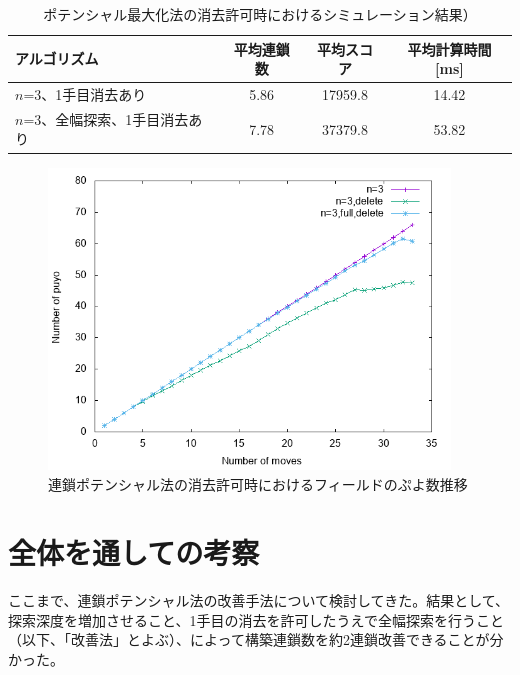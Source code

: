 \documentclass[12pt]{jreport}
\begin{document}
\begin{table}[tb]
\begin{center}
\caption{ポテンシャル最大化法の消去許可時におけるシミュレーション結果）} \label{tab:poten_del}
  \begin{tabular}{|l|c|c|c|} \hline
アルゴリズム & 平均連鎖数 & 平均スコア & 平均計算時間[ms]\\ \hline
$n$=3、1手目消去あり & 5.86 & 17959.8 & 14.42\\ \hline
$n$=3、全幅探索、1手目消去あり & 7.78 & 37379.8 & 53.82\\ \hline
\end{tabular}
\end{center}
\end{table}


\begin{figure}[tb]
  \begin{center}
  \includegraphics[height=8cm]{experiment/Potential/KAI/graph/totalPuyo_N3_N3del_N3fulldel.png}
  \caption{連鎖ポテンシャル法の消去許可時におけるフィールドのぷよ数推移} \label{fig:poten_totalPuyo_del}
\end{center}
\end{figure}



\section{全体を通しての考察}
ここまで、連鎖ポテンシャル法の改善手法について検討してきた。結果として、探索深度を増加させること、1手目の消去を許可したうえで全幅探索を行うこと（以下、「改善法」とよぶ）、によって構築連鎖数を約2連鎖改善できることが分かった。
\end{document}
